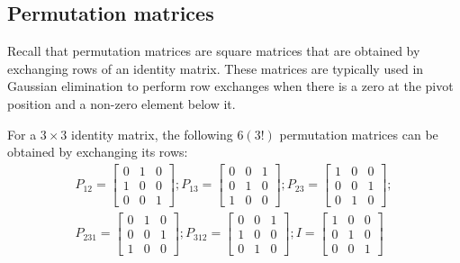\documentclass[../main.tex]{subfiles}
\begin{document}
\subsection{Permutation matrices}
Recall that permutation matrices are square matrices that are obtained by exchanging rows of an identity matrix. These matrices are typically used in Gaussian elimination to perform row exchanges when there is a zero at the pivot position and a non-zero element below it.
\vspace{0.5em}

For a \(3 \times 3\) identity matrix, the following \(6(3!)\) permutation matrices can be obtained by exchanging its rows:
\[
    \begin{gathered}
        P_{12}
        =
        \begin{bmatrix}
            0 & 1 & 0 \\
            1 & 0 & 0 \\
            0 & 0 & 1
        \end{bmatrix};
        P_{13}
        =
        \begin{bmatrix}
            0 & 0 & 1 \\
            0 & 1 & 0 \\
            1 & 0 & 0
        \end{bmatrix};
        P_{23}
        =
        \begin{bmatrix}
            1 & 0 & 0 \\
            0 & 0 & 1 \\
            0 & 1 & 0
        \end{bmatrix}; \\
        P_{231}
        =
        \begin{bmatrix}
            0 & 1 & 0 \\
            0 & 0 & 1 \\
            1 & 0 & 0
        \end{bmatrix};
        P_{312}
        =
        \begin{bmatrix}
            0 & 0 & 1 \\
            1 & 0 & 0 \\
            0 & 1 & 0
        \end{bmatrix};
        I
        =
        \begin{bmatrix}
            1 & 0 & 0 \\
            0 & 1 & 0 \\
            0 & 0 & 1
        \end{bmatrix}
    \end{gathered}
\]
\end{document}
